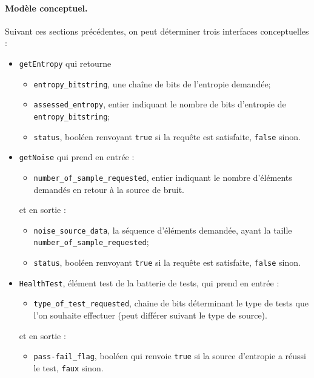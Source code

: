 \paragraph{Modèle conceptuel.\\}
Suivant ces sections précédentes, on peut déterminer trois interfaces conceptuelles :
\begin{itemize}
\item \texttt{getEntropy} qui retourne 
	\begin{itemize}
	\item \texttt{entropy\_bitstring}, une chaîne de bits de l'entropie demandée;
	\item \texttt{assessed\_entropy}, entier indiquant le nombre de bits d'entropie de \texttt{entropy\_bitstring};
	\item \texttt{status}, booléen renvoyant \texttt{true} si la requête est satisfaite, \texttt{false} sinon.\\
	\end{itemize}
\item \texttt{getNoise}	 qui prend en entrée : 
	\begin{itemize}
	\item \texttt{number\_of\_sample\_requested}, entier indiquant le nombre d'éléments demandés en retour à la source de bruit.\\
	\end{itemize}
et en sortie : 
	\begin{itemize}
	\item \texttt{noise\_source\_data}, la séquence d'éléments demandée, ayant la taille \texttt{number\_of\_sample\_requested};
	\item \texttt{status}, booléen renvoyant \texttt{true} si la requête est satisfaite, \texttt{false} sinon.\\
	\end{itemize}
\item \texttt{HealthTest}, élément test de la batterie de tests, qui prend en entrée :
	\begin{itemize}
	\item \texttt{type\_of\_test\_requested}, chaine de bits déterminant le type de tests que l'on souhaite effectuer (peut différer suivant le type de source).\\
	\end{itemize}
et en sortie : 
	\begin{itemize}
	\item \texttt{pass-fail\_flag}, booléen qui renvoie \texttt{true} si la source d'entropie a réussi le test, \texttt{faux} sinon.\\
	\end{itemize}	
\end{itemize}



